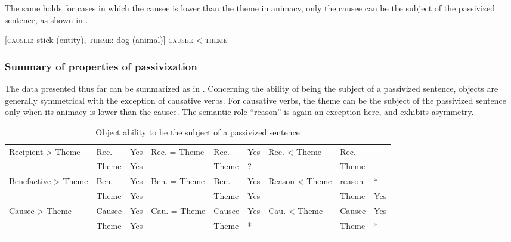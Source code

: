 \documentclass[output=paper,
            colorlinks, citecolor=brown
            ,draftmode
		  ]{langscibook}
\begin{document}
      The same holds for cases in which the causee is lower than the theme in animacy, only the causee can be the subject of the passivized sentence, as shown in . 


\ea%
    \label{ex:yoneda:26}
    [\textsc{causee}: stick (entity), \textsc{theme}: dog (animal)]  \textsc{causee} < \textsc{theme}
    \z
\z



\subsubsection{Summary of properties of passivization}\label{sec:yoneda:3.2.4}



The data presented thus far can be summarized as in . Concerning the ability of being the subject of a passivized sentence, objects are generally symmetrical with the exception of causative verbs. For causative verbs, the theme can be the subject of the passivized sentence only when its animacy is lower than the causee. The semantic role ``reason'' is again an exception here, and exhibits asymmetry. 


\begin{table}
\small
\begin{tabularx}{\textwidth}{QllQllQll}

\lsptoprule

Recipient > Theme & Rec. & Yes & Rec. = Theme & Rec. & Yes & Rec. < Theme & Rec. & {}--\\
& Theme & Yes &  & Theme & ? &  & Theme & {}--\\
\tablevspace
Benefactive > Theme & Ben. & Yes & Ben. = Theme & Ben. & Yes & Reason < Theme & reason & *\\
& Theme & Yes &  & Theme & Yes &  & Theme & Yes\\
\tablevspace
Causee > Theme & Causee & Yes & Cau. = Theme & Causee & Yes & Cau. < Theme & Causee & Yes\\
& Theme & Yes &  & Theme & * &  & Theme & *\\
\lspbottomrule
\end{tabularx}
\caption{Object ability to be the subject of a passivized sentence}
\label{tab:yoneda:2}
\end{table}
\end{document}
